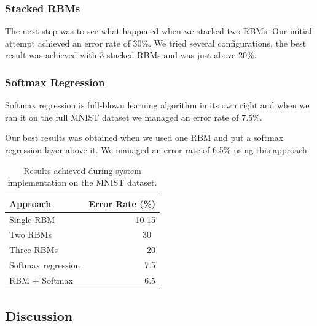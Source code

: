 \documentclass[11pt]{article}
\begin{document}
\subsubsection{Stacked RBMs}

The next step was to see what happened when we stacked two RBMs.  Our initial attempt achieved an error rate of 30\%.  We tried several configurations, the best result was achieved with 3 stacked RBMs and was just above 20\%.

\subsubsection{Softmax Regression}

Softmax regression is full-blown learning algorithm in its own right and when we ran it on the full MNIST dataset we managed an error rate of 7.5\%.

Our best results was obtained when we used one RBM and put a softmax regression layer above it.  We managed an error rate of 6.5\% using this approach.

\begin{table}[htb!]
\centering
\begin{tabular}{|l|r|}        \hline
Approach & Error Rate (\%) \\ \hline
Single RBM & 10-15 \\         \hline
Two RBMs & 30\ \\             \hline
Three RBMs & 20 \\            \hline
Softmax regression & 7.5 \\   \hline
RBM + Softmax & 6.5 \\        \hline
\end{tabular}
\caption{Results achieved during system implementation on the MNIST dataset.}
\label{tbl:results}
\end{table}

\subsection{Discussion}
\end{document}
